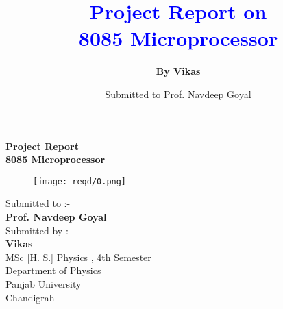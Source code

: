 \documentclass[14pt]{article}
\title{\Huge{\textbf{\textcolor{blue}{Project Report on \\8085 Microprocessor}}}}
\author{\textbf{By Vikas}}
\date{Submitted to Prof. Navdeep Goyal}
\begin{document}

\begin{center}
	\vspace{2em}
	\textbf{ \large Project Report\\}
	\vspace{1em}
	\textbf{\Huge 8085 Microprocessor\\}
	\vspace{0.5em}
	\vspace{2em}
	\begin{figure}[h]
		\centering
		\texttt{[image: reqd/0.png]}
	\end{figure}
	\vspace{2em}
	\large Submitted to :-\\
	\vspace{0.5em}
	\textbf{\Large Prof. Navdeep Goyal}\\
	\vspace{2em}
	\large Submitted by :-\\
	\vspace{0.5em}
	\textbf{\Large Vikas}\\
	\vspace{2em}
	MSc [H. S.] Physics , 4th Semester \\
	Department of Physics \\
	Panjab University\\
	Chandigrah\\
	
\end{center}



\setcounter{tocdepth}{1}
\tableofcontents



\end{document}
